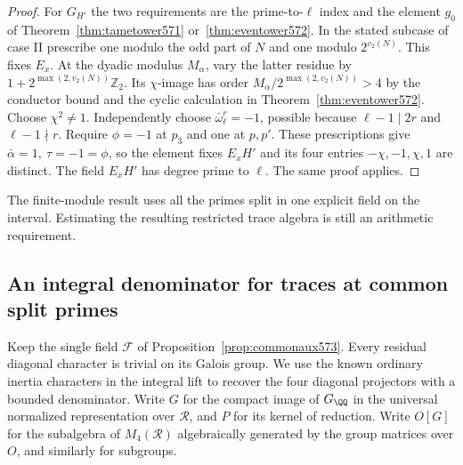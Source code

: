 \documentclass[a4paper,11pt]{article}
\theoremstyle{definition}
\theoremstyle{remark}
\newcommand{\ZZ}{\mathbb Z}\newcommand{\ord}{\operatorname{ord}}
\numberwithin{equation}{section}
\begin{document}
\begin{proof}
For \(G_{H'}\) the two requirements are the prime-to-\(\ell\)
index and the element \(g_0\) of
Theorem~\ref{thm:tametower571} or~\ref{thm:eventower572}.
In the stated subcase of case II prescribe one modulo the
odd part of \(N\) and one modulo \(2^{v_2(N)}\). This fixes
\(E_x\). At the dyadic modulus \(M_\alpha\), vary the latter
residue by \(1+2^{\max(2,v_2(N))}\ZZ_2\). Its \(\chi\)-image
has order \(M_\alpha/2^{\max(2,v_2(N))}>4\) by the
conductor bound and the cyclic calculation in
Theorem~\ref{thm:eventower572}. Choose \(\chi^2\ne1\).
Independently choose \(\bar\omega_\ell^r=-1\), possible
because \(\ell-1\mid 2r\) and \(\ell-1\nmid r\).
Require \(\phi=-1\) at \(p_3\) and one at \(p,p'\).
These prescriptions give \(\bar\alpha=1,\ \tau=-1=\phi\),
so the element fixes \(E_xH'\) and its four entries
\(-\chi,-1,\chi,1\) are distinct. The field \(E_xH'\)
has degree prime to \(\ell\). The same proof applies.
\end{proof}

The finite-module result uses all the primes split in one
explicit field on the interval. Estimating the resulting
restricted trace algebra is still an arithmetic requirement.


\subsection{An integral denominator for traces at common split primes}
\label{sec:denominator574}

Keep the single field \(\mathcal F\) of
Proposition~\ref{prop:commonaux573}. Every residual diagonal
character is trivial on its Galois group. We use the known
ordinary inertia characters in the integral lift to recover
the four diagonal projectors with a bounded denominator.
Write \(G\) for the compact image of \(G_\QQ\) in the
universal normalized representation over \(\mathcal R\), and
\(P\) for its kernel of reduction. Write \(O[G]\) for the
subalgebra of \(M_4(\mathcal R)\) algebraically generated by
the group matrices over \(O\), and similarly for subgroups.
\end{document}
